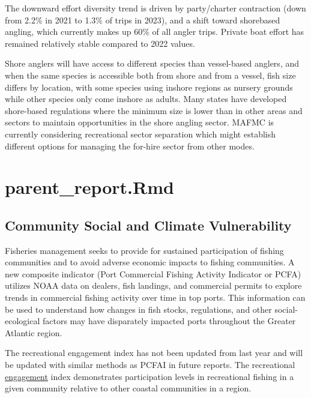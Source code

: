 \documentclass[
  10pt,
]{article}
\begin{document}
The downward effort diversity trend is driven by party/charter contraction (down from 2.2\% in 2021 to 1.3\% of trips in 2023), and a shift toward shorebased angling, which currently makes up 60\% of all angler trips. Private boat effort has remained relatively stable compared to 2022 values.

Shore anglers will have access to different species than vessel-based anglers, and when the same species is accessible both from shore and from a vessel, fish size differs by location, with some species using inshore regions as nursery grounds while other species only come inshore as adults. Many states have developed shore-based regulations where the minimum size is lower than in other areas and sectors to maintain opportunities in the shore angling sector. MAFMC is currently considering recreational sector separation which might establish different options for managing the for-hire sector from other modes.

\section{parent\_report.Rmd}\label{parent_report.rmd-3}

\subsection{Community Social and Climate Vulnerability}\label{community-social-and-climate-vulnerability}

Fisheries management seeks to provide for sustained participation of fishing communities and to avoid adverse economic impacts to fishing communities. A new composite indicator (Port Commercial Fishing Activity Indicator or PCFA) utilizes NOAA data on dealers, fish landings, and commercial permits to explore trends in commercial fishing activity over time in top ports. This information can be used to understand how changes in fish stocks, regulations, and other social-ecological factors may have disparately impacted ports throughout the Greater Atlantic region.

The recreational engagement index has not been updated from last year and will be updated with similar methods as PCFAI in future reports. The recreational \href{https://noaa-edab.github.io/catalog/engagement.html}{engagement} index demonstrates participation levels in recreational fishing in a given community relative to other coastal communities in a region.
\end{document}
